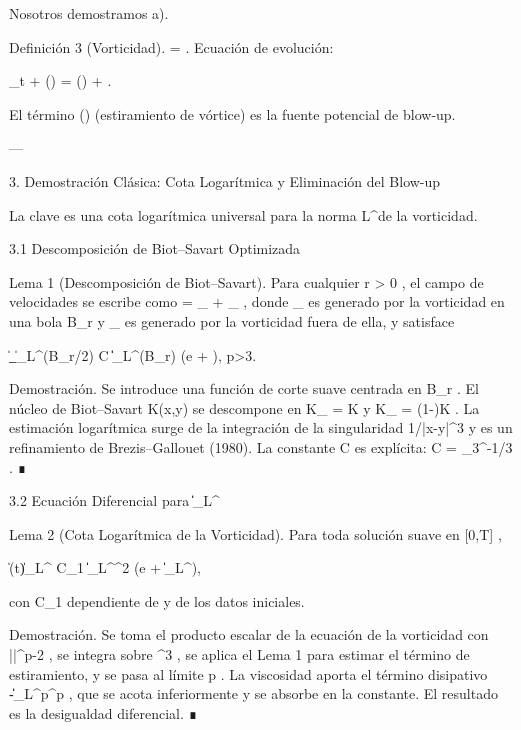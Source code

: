 \documentclass[12pt,twoside]{book}
\begin{document}
Nosotros demostramos a).

Definición 3 (Vorticidad).
 \boldsymbol{\omega} = \nabla\times{} . Ecuación de evolución:

\partial_t \boldsymbol{\omega} + (\cdot\nabla)\boldsymbol{\omega} = (\boldsymbol{\omega}\cdot\nabla) + \nu \Delta \boldsymbol{\omega}.

El término  (\boldsymbol{\omega}\cdot\nabla)  (estiramiento de vórtice) es la fuente potencial de blow-up.

---

3. Demostración Clásica: Cota Logarítmica y Eliminación del Blow-up

La clave es una cota logarítmica universal para la norma  L^\infty  de la vorticidad.

3.1 Descomposición de Biot–Savart Optimizada

Lema 1 (Descomposición de Biot–Savart).
Para cualquier  r > 0 , el campo de velocidades se escribe como   = _{} + _{} , donde  _{}  es generado por la vorticidad en una bola  B_r  y  _{}  es generado por la vorticidad fuera de ella, y satisface

\|\nabla {}_{}\|_{L^\infty(B_{r/2})} \le C \|\boldsymbol{\omega}\|_{L^\infty(B_r)} \log\left(e + \right), \quad p>3.

Demostración. Se introduce una función de corte suave  \chi  centrada en  B_r . El núcleo de Biot–Savart  K(x,y)  se descompone en  K_{} = \chi K  y  K_{} = (1-\chi)K . La estimación logarítmica surge de la integración de la singularidad  1/|x-y|^3  y es un refinamiento de Brezis–Gallouet (1980). La constante  C  es explícita:  C = \omega_3^{-1/3} . ∎

3.2 Ecuación Diferencial para  \|\boldsymbol{\omega}\|_{L^\infty} 

Lema 2 (Cota Logarítmica de la Vorticidad).
Para toda solución suave en  [0,T] ,

\|\boldsymbol{\omega}(t)\|_{L^\infty} \le C_1 \|\boldsymbol{\omega}\|_{L^\infty}^2 \log(e + \|\boldsymbol{\omega}\|_{L^\infty}),

con  C_1  dependiente de  \nu  y de los datos iniciales.

Demostración. Se toma el producto escalar de la ecuación de la vorticidad con  |\boldsymbol{\omega}|^{p-2}\boldsymbol{\omega} , se integra sobre  ^3 , se aplica el Lema 1 para estimar el término de estiramiento, y se pasa al límite  p \to \infty . La viscosidad aporta el término disipativo  -\nu \|\nabla \boldsymbol{\omega}\|_{L^p}^p , que se acota inferiormente y se absorbe en la constante. El resultado es la desigualdad diferencial. ∎
\end{document}
